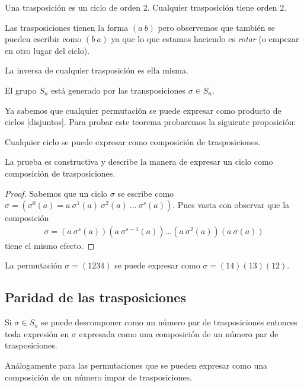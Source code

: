 \begin{dfn}[Trasposición]
	Una trasposición es un ciclo de orden 2. Cualquier trasposición tiene orden 2.
\end{dfn}

Las trasposiciones tienen la forma $(a\ b)$ pero observemos que también se pueden escribir como $(b\ a)$ ya que lo que estamos haciendo es \textit{rotar} (o empezar en otro lugar del ciclo).

\begin{pro}
	La inversa de cualquier trasposición es ella misma.
\end{pro}

\begin{thm}
	El grupo $S_n$ está generado por las transposiciones $\sigma \in S_n$.
\end{thm}

Ya sabemos que cualquier permutación se puede expresar como producto de ciclos [disjuntos]. Para probar este teorema probaremos la siguiente proposición:

\begin{pro}
	Cualquier ciclo se puede expresar como composición de trasposiciones.
\end{pro}

La prueba es constructiva y describe la manera de expresar un ciclo como composición de trasposiciones.

\begin{proof}
	Sabemos que un ciclo $\sigma$ se escribe como $\sigma = (\sigma^0(a) = a\ \sigma^1(a)\ \sigma^2(a)\ \dots \ \sigma^s(a))$. Pues vasta con observar que la composición
	\begin{align*}
		\sigma = (a\ \sigma^s(a))(a\ \sigma^{s-1}(a))\dots(a\ \sigma^2(a))(a\ \sigma(a))
	\end{align*}
	tiene el mismo efecto.
\end{proof}

\begin{ej}
	La permutación $\sigma = (1234)$ se puede expresar como $\sigma = (14)(13)(12)$.
\end{ej}

\subsection{Paridad de las trasposiciones}

\begin{thm}
	\label{thm:paridadpermutaciones}
	Si $\sigma \in S_n$ se puede descomponer como un número par de trasposiciones entonces toda expresión en $\sigma$ expresada como una composición de un número par de trasposiciones.
	
	Análogamente para las permutaciones que se pueden expresar como una composición de un número impar de trasposiciones.
\end{thm}

